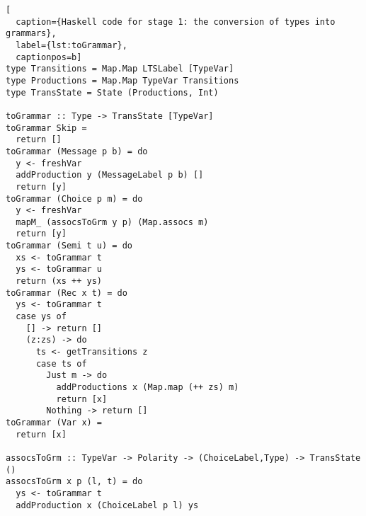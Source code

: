 \begin{lstlisting}[
  caption={Haskell code for stage 1: the conversion of types into grammars},
  label={lst:toGrammar},
  captionpos=b]
type Transitions = Map.Map LTSLabel [TypeVar]
type Productions = Map.Map TypeVar Transitions
type TransState = State (Productions, Int)

toGrammar :: Type -> TransState [TypeVar]
toGrammar Skip =
  return []
toGrammar (Message p b) = do
  y <- freshVar
  addProduction y (MessageLabel p b) []
  return [y]
toGrammar (Choice p m) = do
  y <- freshVar
  mapM_ (assocsToGrm y p) (Map.assocs m)
  return [y]
toGrammar (Semi t u) = do
  xs <- toGrammar t
  ys <- toGrammar u
  return (xs ++ ys)
toGrammar (Rec x t) = do
  ys <- toGrammar t
  case ys of
    [] -> return []
    (z:zs) -> do
      ts <- getTransitions z
      case ts of
        Just m -> do
          addProductions x (Map.map (++ zs) m)
          return [x]
        Nothing -> return []
toGrammar (Var x) =
  return [x]

assocsToGrm :: TypeVar -> Polarity -> (ChoiceLabel,Type) -> TransState ()
assocsToGrm x p (l, t) = do
  ys <- toGrammar t
  addProduction x (ChoiceLabel p l) ys
\end{lstlisting}


